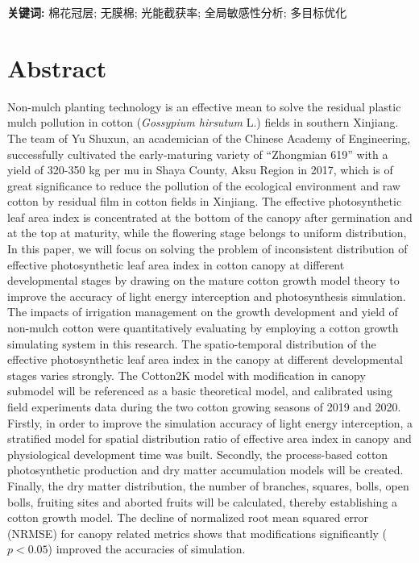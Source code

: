 \textbf{关键词:} 棉花冠层; 无膜棉; 光能截获率; 全局敏感性分析; 多目标优化

\chapter*{Abstract}
Non-mulch planting technology is an effective mean to solve the residual plastic mulch pollution in cotton (\textit{Gossypium hirsutum} L.) fields in southern Xinjiang.
The team of Yu Shuxun, an academician of the Chinese Academy of Engineering, successfully cultivated the early-maturing variety of ``Zhongmian 619'' with a yield of 320{-}350 kg per mu in Shaya County, Aksu Region in 2017,
which is of great significance to reduce the pollution of the ecological environment and raw cotton by residual film in cotton fields in Xinjiang. %
The effective photosynthetic leaf area index is concentrated at the bottom of the canopy after germination and at the top at maturity, while the flowering stage belongs to uniform distribution, %
In this paper, we will focus on solving the problem of inconsistent distribution of effective photosynthetic leaf area index in cotton canopy at different developmental stages by drawing on the mature cotton growth model theory to improve the accuracy of light energy interception and photosynthesis simulation.
The impacts of irrigation management on the growth development and yield of non-mulch cotton were quantitatively evaluating by employing a cotton growth simulating system in this research.
The spatio-temporal distribution of the effective photosynthetic leaf area index in the canopy at different developmental stages varies strongly.
The Cotton2K model with modification in canopy submodel will be referenced as a basic theoretical model, and calibrated using field experiments data during the two cotton growing seasons of 2019 and 2020.
Firstly, in order to improve the simulation accuracy of light energy interception, a stratified model for spatial distribution ratio of effective area index in canopy and physiological development time was built.
Secondly, the process-based cotton photosynthetic production and dry matter accumulation models will be created.
Finally, the dry matter distribution, the number of branches, squares, bolls, open bolls, fruiting sites and aborted fruits will be calculated, thereby establishing a cotton growth model.
The decline of normalized root mean squared error (NRMSE) for canopy related metrics shows that modifications significantly ($p < 0.05$) improved the accuracies of simulation.


